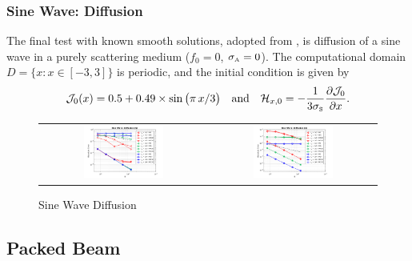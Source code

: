 \subsubsection{Sine Wave: Diffusion}

The final test with known smooth solutions, adopted from \cite{radice_etal_2013}, is diffusion of a sine wave in a purely scattering medium ($f_{0}=0$, $\sigma_{\mbox{\tiny A}}=0$).  
The computational domain $D=\{x:x\in[-3,3]\}$ is periodic, and the initial condition is given by
\begin{equation}
  \mathcal{J}_{0}(x)=0.5+0.49\times\sin\big(\pi\,x/3\big)
  \quad\text{and}\quad
  \mathcal{H}_{x,0}
  =-\frac{1}{3\sigma_{\mbox{\tiny S}}}\frac{\partial \mathcal{J}_{0}}{\partial x}.  
\end{equation}

\begin{figure}[h]
  \centering
  \begin{tabular}{cc}
    \includegraphics[width=0.5\textwidth]{figures/SineWaveDiffusionN} &
    \includegraphics[width=0.5\textwidth]{figures/SineWaveDiffusionG}
    \end{tabular}
   \caption{Sine Wave Diffusion}
  \label{fig:SineWaveDiffusion}
\end{figure}

\subsection{Packed Beam}

